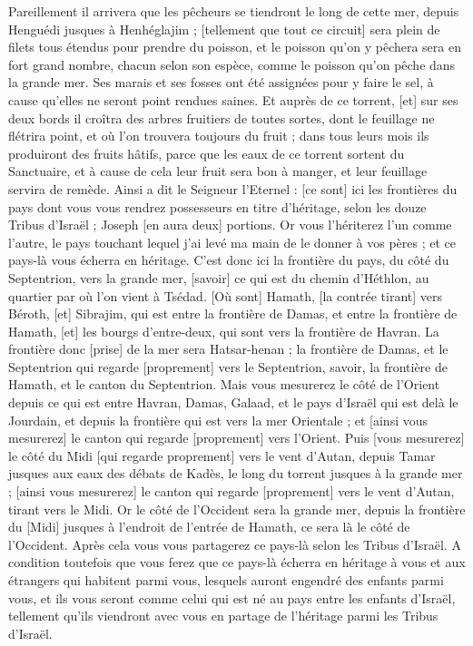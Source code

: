 \begin{multicols}{2}
Pareillement il arrivera que les pêcheurs se tiendront le long de cette mer, depuis Henguédi jusques à Henhéglajim ; [tellement que tout ce circuit] sera plein de filets tous étendus pour prendre du poisson, et le poisson qu'on y pêchera sera en fort grand nombre, chacun selon son espèce, comme le poisson qu'on pêche dans la grande mer.
Ses marais et ses fosses ont été assignées pour y faire le sel, à cause qu'elles ne seront point rendues saines.
Et auprès de ce torrent, [et] sur ses deux bords il croîtra des arbres fruitiers de toutes sortes, dont le feuillage ne flétrira point, et où l'on trouvera toujours du fruit ; dans tous leurs mois ils produiront des fruits hâtifs, parce que les eaux de ce torrent sortent du Sanctuaire, et à cause de cela leur fruit sera bon à manger, et leur feuillage servira de remède.
Ainsi a dit le Seigneur l'Eternel : [ce sont] ici les frontières du pays dont vous vous rendrez possesseurs en titre d'héritage, selon les douze Tribus d'Israël ; Joseph [en aura deux] portions.
Or vous l'hériterez l'un comme l'autre, le pays touchant lequel j'ai levé ma main de le donner à vos pères ; et ce pays-là vous écherra en héritage.
C'est donc ici la frontière du pays, du côté du Septentrion, vers la grande mer, [savoir] ce qui est du chemin d'Héthlon, au quartier par où l'on vient à Tsédad.
[Où sont] Hamath, [la contrée tirant] vers Béroth, [et] Sibrajim, qui est entre la frontière de Damas, et entre la frontière de Hamath, [et] les bourgs d'entre-deux, qui sont vers la frontière de Havran.
La frontière donc [prise] de la mer sera Hatsar-henan ; la frontière de Damas, et le Septentrion qui regarde [proprement] vers le Septentrion, savoir, la frontière de Hamath, et le canton du Septentrion.
Mais vous mesurerez le côté de l'Orient depuis ce qui est entre Havran, Damas, Galaad, et le pays d'Israël qui est delà le Jourdain, et depuis la frontière qui est vers la mer Orientale ; et [ainsi vous mesurerez] le canton qui regarde [proprement] vers l'Orient.
Puis [vous mesurerez] le côté du Midi [qui regarde proprement] vers le vent d'Autan, depuis Tamar jusques aux eaux des débats de Kadès, le long du torrent jusques à la grande mer ; [ainsi vous mesurerez] le canton qui regarde [proprement] vers le vent d'Autan, tirant vers le Midi.
Or le côté de l'Occident sera la grande mer, depuis la frontière du [Midi] jusques à l'endroit de l'entrée de Hamath, ce sera là le côté de l'Occident.
Après cela vous vous partagerez ce pays-là selon les Tribus d'Israël.
A condition toutefois que vous ferez que ce pays-là écherra en héritage à vous et aux étrangers qui habitent parmi vous, lesquels auront engendré des enfants parmi vous, et ils vous seront comme celui qui est né au pays entre les enfants d'Israël, tellement qu'ils viendront avec vous en partage de l'héritage parmi les Tribus d'Israël.

\end{multicols}
